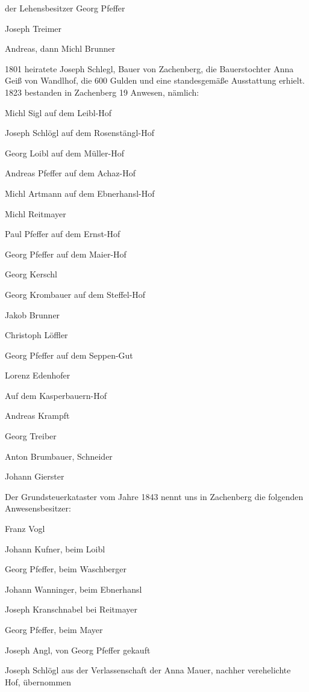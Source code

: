 der Lehensbesitzer Georg Pfeffer

Joseph Treimer

Andreas, dann Michl Brunner



1801 heiratete Joseph Schlegl, Bauer von Zachenberg, die Bauerstochter Anna Geiß
von Wandlhof, die 600 Gulden und eine standesgemäße Ausstattung erhielt. 1823
bestanden in Zachenberg 19 Anwesen, nämlich:



Michl Sigl auf dem Leibl-Hof

Joseph Schlögl auf dem Rosenstängl-Hof

Georg Loibl auf dem Müller-Hof

Andreas Pfeffer auf dem Achaz-Hof

Michl Artmann auf dem Ebnerhansl-Hof

Michl Reitmayer

Paul Pfeffer auf dem Ernst-Hof

Georg Pfeffer auf dem Maier-Hof

Georg Kerschl

Georg Krombauer auf dem Steffel-Hof

Jakob Brunner

Christoph Löffler

Georg Pfeffer auf dem Seppen-Gut

Lorenz Edenhofer

Auf dem Kasperbauern-Hof

Andreas Krampft

Georg Treiber

Anton Brumbauer, Schneider

Johann Gierster



Der Grundsteuerkataster vom Jahre 1843 nennt uns in Zachenberg die folgenden
Anwesensbesitzer:



Franz Vogl

Johann Kufner, beim Loibl

Georg Pfeffer, beim Waschberger

Johann Wanninger, beim Ebnerhansl

Joseph Kranschnabel bei Reitmayer

Georg Pfeffer, beim Mayer

Joseph Angl, von Georg Pfeffer gekauft

Joseph Schlögl aus der Verlassenschaft der Anna Mauer, nachher verehelichte Hof,
übernommen

